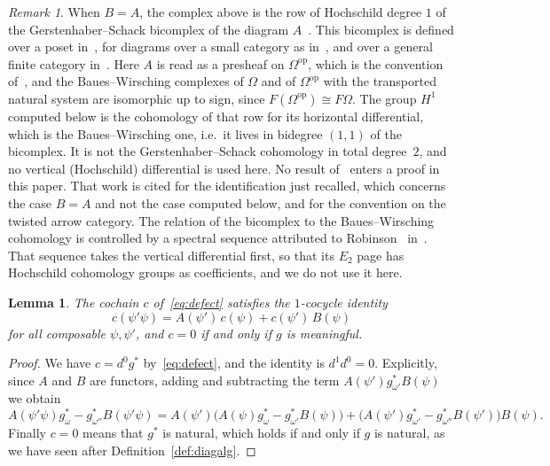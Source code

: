 \documentclass[11pt,a4paper]{article}
\theoremstyle{plain}
\newtheorem{lemma}[theorem]{Lemma}
\theoremstyle{definition}
\theoremstyle{remark}
\newtheorem{remark}[theorem]{Remark}
\newcommand{\cat}[1]{\mathsf{#1}}
\newcommand{\catO}{\cat{\Omega}}
\newcommand{\op}{\mathrm{op}}
\begin{document}
\begin{remark}\label{rem:GS}
When $B = A$, the complex above is the row of Hochschild degree $1$ of the
Gerstenhaber--Schack bicomplex of the diagram
$A$~\cite[Prop.~3.8]{caputi_diagrammatic_2025}. This bicomplex is defined over
a poset in~\cite{gerstenhaber_schack_1983}, for diagrams over a small category
as in~\cite[\S2]{gerstenhaber_simplicial_1983}, and over a general finite
category in~\cite[eq.~(4)]{caputi_diagrammatic_2025}. Here $A$ is read as a
presheaf on $\catO^{\op}$, which is the convention
of~\cite{caputi_diagrammatic_2025}, and the Baues--Wirsching complexes of
$\catO$ and of $\catO^{\op}$ with the transported natural system are
isomorphic up to sign, since $F(\catO^{\op}) \cong F\catO$. The group $H^{1}$
computed below is the cohomology of that row for its horizontal
differential, which is the Baues--Wirsching one, i.e.\ it lives in bidegree
$(1,1)$ of the bicomplex. It is not the Gerstenhaber--Schack cohomology in
total degree~$2$, and no vertical (Hochschild) differential is used here. No
result of~\cite{caputi_diagrammatic_2025} enters a proof in this paper. That
work is cited for the identification just recalled, which concerns the case
$B = A$ and not the case computed below, and for the convention on the twisted
arrow category. The relation of the bicomplex to the Baues--Wirsching
cohomology is controlled by a spectral sequence attributed to
Robinson~\cite{robinson_cohomology_2008}
in~\cite[\S1, Prop.~3.10 and Thm.~3.11]{caputi_diagrammatic_2025}. That
sequence takes the vertical differential first, so that its $E_2$ page has
Hochschild cohomology groups as coefficients, and we do not use it here.
\end{remark}

\begin{lemma}\label{lem:cocycle}
The cochain $c$ of~\eqref{eq:defect} satisfies the $1$-cocycle identity
\[
c(\psi'\psi) = A(\psi')\,c(\psi) + c(\psi')\,B(\psi)
\]
for all composable $\psi,\psi'$, and $c = 0$ if and only if $g$ is
meaningful.
\end{lemma}

\begin{proof}
We have $c = d^{0}g^{*}$ by~\eqref{eq:defect}, and the identity is
$d^{1}d^{0} = 0$. Explicitly, since $A$ and $B$ are functors, adding and
subtracting the term $A(\psi')g^{*}_{\omega'}B(\psi)$ we obtain
\[
A(\psi'\psi)g^{*}_{\omega} - g^{*}_{\omega''}B(\psi'\psi)
= A(\psi')\bigl(A(\psi)g^{*}_{\omega} - g^{*}_{\omega'}B(\psi)\bigr)
+ \bigl(A(\psi')g^{*}_{\omega'} - g^{*}_{\omega''}B(\psi')\bigr)B(\psi).
\]
Finally $c = 0$ means that $g^{*}$ is natural, which holds if and only if $g$
is natural, as we have seen after Definition~\ref{def:diagalg}.
\end{proof}
\end{document}
